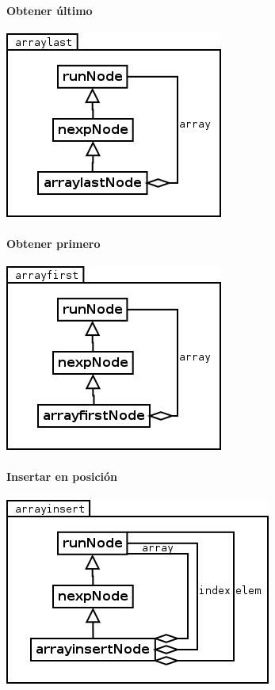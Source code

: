 \paragraph {Obtener último}
\begin{center}
\includegraphics[scale=0.4]{last.png} \\
\end{center}

\paragraph {Obtener primero}
\begin{center}
\includegraphics[scale=0.4]{first.png} \\
\end{center}

\paragraph {Insertar en posición}
\begin{center}
\includegraphics[scale=0.4]{insert.png} \\
\end{center}

